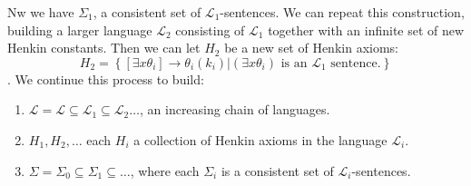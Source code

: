 \documentclass[9pt,a4paper, twocolumn]{article}
\newcommand{\curveL}{\mathcal{L}}
\begin{document}
        Nw we have $\Sigma_1$, a consistent set of $\curveL_1$-sentences. We can repeat this construction, building a larger language $\curveL_2$ consisting of $\curveL_1$ together with an infinite set of new Henkin constants. Then we can let $H_2$ be a new set of Henkin axioms: 
        \begin{equation}
            H_2 = \left\{
                [\exists x\theta_i]\rightarrow \theta_i(k_i) | (\exists x\theta_i) \text{ is an } \curveL_1 \text{ sentence.}
            \right\}
        \end{equation}.
        We continue this process to build:
        \begin{enumerate}
            \item $\curveL = \curveL\subseteq \curveL_1\subseteq \curveL_2\dots$, an increasing chain of languages.
            \item $H_1,H_2,\dots$ each $H_i$ a collection of Henkin axioms in the language $\curveL_i$.
            \item $\Sigma = \Sigma_0\subseteq\Sigma_1\subseteq \dots$, where each $\Sigma_i$ is a consistent set of $\curveL_i$-sentences.
        \end{enumerate}
        
\end{document}
